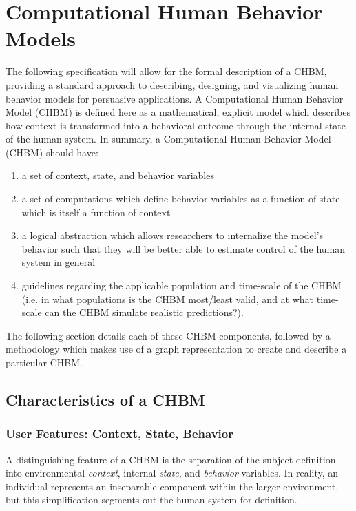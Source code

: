 \documentclass[runningheads,a4paper]{llncs}
\begin{document}
\section{Computational Human Behavior Models}
The following specification will allow for the formal description of a CHBM, providing a standard approach to describing, designing, and visualizing human behavior models for persuasive applications.
A Computational Human Behavior Model (CHBM) is defined here as a mathematical, explicit model which describes how context is transformed into a behavioral outcome through the internal state of the human system.
In summary, a Computational Human Behavior Model (CHBM) should have: 
\begin{enumerate}
    \item a set of context, state, and behavior variables
    \item a set of computations which define behavior variables as a function of state which is itself a function of context
    \item a logical abstraction which allows researchers to internalize the model's behavior such that they will be better able to estimate control of the human system in general
    \item guidelines regarding the applicable population and time-scale of the CHBM (i.e. in what populations is the CHBM most/least valid, and at what time-scale can the CHBM simulate realistic predictions?). 
\end{enumerate}

The following section details each of these CHBM components, followed by a methodology which makes use of a graph representation to create and describe a particular CHBM.

\subsection{Characteristics of a CHBM}
\subsubsection{User Features: Context, State, Behavior}
A distinguishing feature of a CHBM is the separation of the subject definition into environmental \emph{context}, internal \emph{state}, and \emph{behavior} variables.
In reality, an individual represents an inseparable component within the larger environment, but this simplification segments out the human system for definition.
\end{document}
